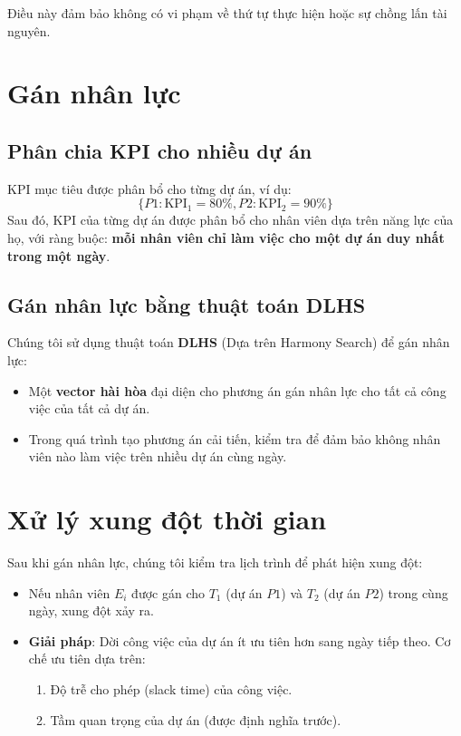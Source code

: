 \documentclass[a4paper,12pt]{article}
\begin{document}
Điều này đảm bảo không có vi phạm về thứ tự thực hiện hoặc sự chồng lấn tài nguyên.

\section{Gán nhân lực}

\subsection{Phân chia KPI cho nhiều dự án}
KPI mục tiêu được phân bổ cho từng dự án, ví dụ:
\[
\{ P1: \text{KPI}_1 = 80\%, P2: \text{KPI}_2 = 90\% \}
\]
Sau đó, KPI của từng dự án được phân bổ cho nhân viên dựa trên năng lực của họ, với ràng buộc: \textbf{mỗi nhân viên chỉ làm việc cho một dự án duy nhất trong một ngày}.

\subsection{Gán nhân lực bằng thuật toán DLHS}
Chúng tôi sử dụng thuật toán \textbf{DLHS} (Dựa trên Harmony Search) để gán nhân lực:
\begin{itemize}
    \item Một \textbf{vector hài hòa} đại diện cho phương án gán nhân lực cho tất cả công việc của tất cả dự án.
    \item Trong quá trình tạo phương án cải tiến, kiểm tra để đảm bảo không nhân viên nào làm việc trên nhiều dự án cùng ngày.
\end{itemize}

\section{Xử lý xung đột thời gian}

Sau khi gán nhân lực, chúng tôi kiểm tra lịch trình để phát hiện xung đột:
\begin{itemize}
    \item Nếu nhân viên $E_i$ được gán cho $T_1$ (dự án $P1$) và $T_2$ (dự án $P2$) trong cùng ngày, xung đột xảy ra.
    \item \textbf{Giải pháp}: Dời công việc của dự án ít ưu tiên hơn sang ngày tiếp theo. Cơ chế ưu tiên dựa trên:
    \begin{enumerate}
        \item Độ trễ cho phép (slack time) của công việc.
        \item Tầm quan trọng của dự án (được định nghĩa trước).
    \end{enumerate}
\end{itemize}
\end{document}
